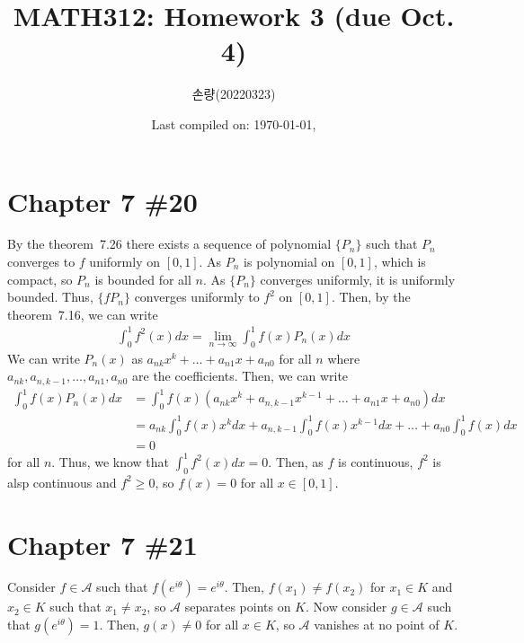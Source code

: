 \documentclass{scrartcl}
\title{MATH312: Homework 3 (due Oct. 4)}
\author{손량(20220323)}
\date{Last compiled on: \today, \currenttime}
\begin{document}
\maketitle

\section{Chapter 7 \#20}
By the theorem~7.26 there exists a sequence of polynomial \(\{P_n\}\) such that
\(P_n\) converges to \(f\) uniformly on \([0, 1]\). As \(P_n\) is polynomial on
\([0, 1]\), which is compact, so \(P_n\) is bounded for all \(n\). As
\(\{P_n\}\) converges uniformly, it is uniformly bounded. Thus, \(\{f P_n\}\)
converges uniformly to \(f^2\) on \([0, 1]\). Then, by the theorem~7.16, we can
write
\begin{align*}
  \int^1_0 f^2(x) dx = \lim_{n \to \infty} \int^1_0 f(x) P_n(x) dx
\end{align*}
We can write \(P_n(x)\) as \(a_{nk} x^k + \dots + a_{n1} x + a_{n0}\) for all
\(n\) where \(a_{nk}, a_{n, k - 1}, \dots, a_{n1}, a_{n0}\) are the
coefficients. Then, we can write
\begin{align*}
  \int^1_0 f(x) P_n(x) dx
  &= \int^1_0 f(x) (a_{nk} x^k + a_{n, k - 1} x^{k - 1} + \dots + a_{n1} x +
    a_{n0}) dx \\
  &= a_{nk} \int^1_0 f(x) x^k dx + a_{n, k - 1} \int^1_0 f(x) x^{k - 1} dx +
    \dots + a_{n0} \int^1_0 f(x) dx \\
  &= 0
\end{align*}
for all \(n\). Thus, we know that \(\int^1_0 f^2(x) dx = 0\). Then, as \(f\) is
continuous, \(f^2\) is alsp continuous and \(f^2 \ge 0\), so \(f(x) = 0\) for
all \(x \in [0, 1]\).

\section{Chapter 7 \#21}
Consider \(f \in \mathscr{A}\) such that \(f(e^{i\theta}) = e^{i\theta}\).
Then, \(f(x_1) \not = f(x_2)\) for \(x_1 \in K\) and \(x_2 \in K\) such that
\(x_1 \not = x_2\), so \(\mathscr{A}\) separates points on \(K\). Now consider
\(g \in \mathscr{A}\) such that \(g(e^{i\theta}) = 1\). Then, \(g(x) \not = 0\)
for all \(x \in K\), so \(\mathscr{A}\) vanishes at no point of \(K\).
\end{document}
